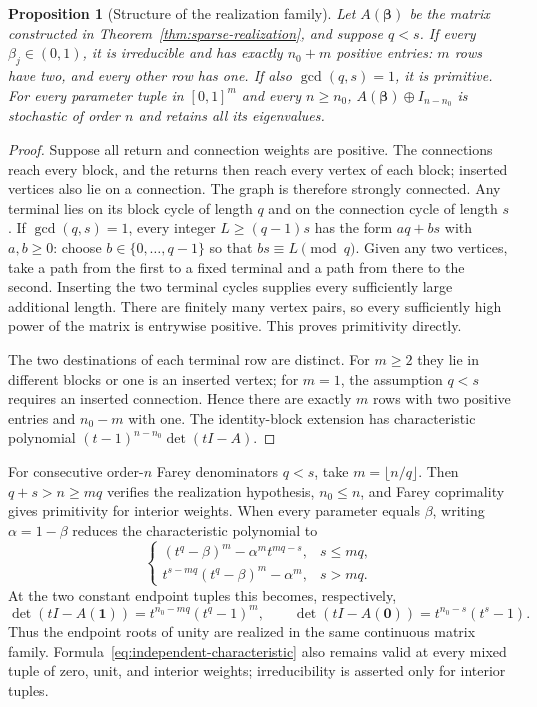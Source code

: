 \documentclass[11pt,a4paper]{article}
\newtheorem{proposition}[theorem]{Proposition}
\theoremstyle{definition}
\theoremstyle{remark}
\numberwithin{equation}{section}
\begin{document}
\begin{proposition}[Structure of the realization family]\label{prop:family-structure}
Let $A(\boldsymbol\beta)$ be the matrix constructed in
Theorem~\ref{thm:sparse-realization}, and suppose $q<s$.
If every $\beta_j\in(0,1)$, it is irreducible and has exactly $n_0+m$
positive entries: $m$ rows have two, and every other row has one.
If also $\gcd(q,s)=1$, it is primitive.
For every parameter tuple in $[0,1]^m$ and every $n\ge n_0$,
$A(\boldsymbol\beta)\oplus I_{n-n_0}$ is stochastic of order $n$
and retains all its eigenvalues.
\end{proposition}
\begin{proof}
Suppose all return and connection weights are positive. The connections reach every block, and the returns then reach every vertex of each block; inserted vertices also lie on a connection. The graph is therefore strongly connected. Any terminal lies on its block cycle of length $q$ and on the connection cycle of length $s$.
If $\gcd(q,s)=1$, every integer $L\ge(q-1)s$ has the form $aq+bs$ with $a,b\ge0$: choose $b\in\{0,\ldots,q-1\}$ so that $bs\equiv L\pmod q$. Given any two vertices, take a path from the first to a fixed terminal and a path from there to the second. Inserting the two terminal cycles supplies every sufficiently large additional length. There are finitely many vertex pairs, so every sufficiently high power of the matrix is entrywise positive. This proves primitivity directly.

The two destinations of each terminal row are distinct. For $m\ge2$ they lie in different blocks or one is an inserted vertex; for $m=1$, the assumption $q<s$ requires an inserted connection. Hence there are exactly $m$ rows with two positive entries and $n_0-m$ with one. The identity-block extension has characteristic polynomial $(t-1)^{n-n_0}\det(tI-A)$.
\end{proof}

For consecutive order-$n$ Farey denominators $q<s$, take $m=\lfloor n/q\rfloor$. Then $q+s>n\ge mq$ verifies the realization hypothesis, $n_0\le n$, and Farey coprimality gives primitivity for interior weights. When every parameter equals $\beta$, writing $\alpha=1-\beta$ reduces the characteristic polynomial to
\[
 \begin{cases}
 (t^q-\beta)^m-\alpha^m t^{mq-s},&s\le mq,\\
 t^{s-mq}(t^q-\beta)^m-\alpha^m,&s>mq.
 \end{cases}
\]
At the two constant endpoint tuples this becomes, respectively,
\[
 \det(tI-A(\mathbf1))=t^{n_0-mq}(t^q-1)^m,
 \qquad
 \det(tI-A(\mathbf0))=t^{n_0-s}(t^s-1).
\]
Thus the endpoint roots of unity are realized in the same continuous matrix family. Formula~\eqref{eq:independent-characteristic} also remains valid at every mixed tuple of zero, unit, and interior weights; irreducibility is asserted only for interior tuples.
\end{document}
